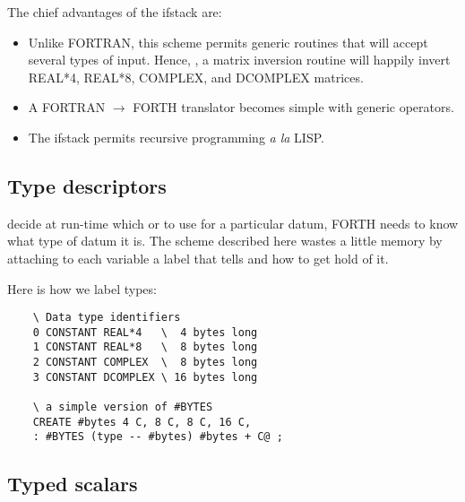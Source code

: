 The chief advantages of the ifstack are:
\begin{itemize}
    \item Unlike FORTRAN, this scheme permits generic routines that will accept several types of input. Hence, \eg, a matrix inversion routine will happily invert REAL*4, REAL*8, COMPLEX, and DCOMPLEX matrices.
    \item A FORTRAN $\rightarrow$ FORTH translator becomes simple with generic operators.
    \item The ifstack permits recursive programming \textit{a la} LISP.
\end{itemize}

\subsection{Type descriptors}
 decide at run-time which  or \regc{!} to use for a particular datum, FORTH needs to know what type of datum it is. The scheme described here wastes a little memory by attaching to each variable a label that tells  and  how to get hold of it.

Here is how we label types:
\begin{lstlisting}
    \ Data type identifiers
    0 CONSTANT REAL*4   \  4 bytes long
    1 CONSTANT REAL*8   \  8 bytes long
    2 CONSTANT COMPLEX  \  8 bytes long
    3 CONSTANT DCOMPLEX \ 16 bytes long

    \ a simple version of #BYTES
    CREATE #bytes 4 C, 8 C, 8 C, 16 C,
    : #BYTES (type -- #bytes) #bytes + C@ ;
\end{lstlisting}

\subsection{Typed scalars}

